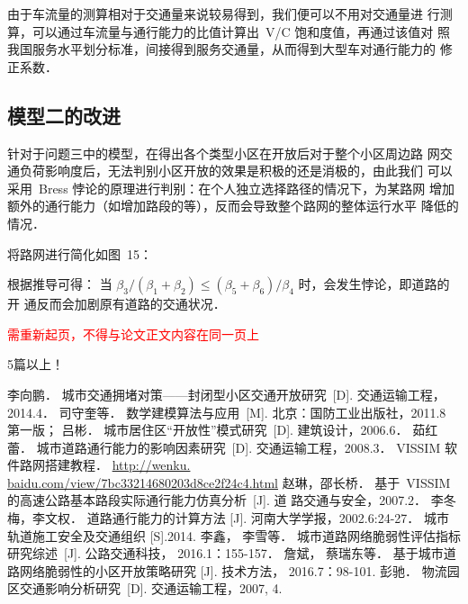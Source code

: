 \documentclass[12pt,a4paper]{nmmcm}
\begin{document}
由于车流量的测算相对于交通量来说较易得到，我们便可以不用对交通量进
行测算，可以通过车流量与通行能力的比值计算出~V/C 饱和度值，再通过该值对
照我国服务水平划分标准，间接得到服务交通量，从而得到大型车对通行能力的
修正系数．


\subsection{模型二的改进}

针对于问题三中的模型，在得出各个类型小区在开放后对于整个小区周边路
网交通负荷影响度后，无法判别小区开放的效果是积极的还是消极的，由此我们
可以采用~Bress 悖论的原理进行判别：在个人独立选择路径的情况下，为某路网
增加额外的通行能力（如增加路段的等），反而会导致整个路网的整体运行水平
降低的情况．

将路网进行简化如图~15：

根据推导可得： 当 $\beta_{3}/\left(\beta_{1}+\beta_{2}\right) \leq\left(\beta_{5}+\beta_{6}\right)/\beta_{4}$ 时，会发生悖论，即道路的开
通反而会加剧原有道路的交通状况．

\textcolor{red}{需重新起页，不得与论文正文内容在同一页上}

\begin{rmk}
5篇以上！
\end{rmk}

\newpage

\begin{thebibliography}{99}
 李向鹏． 城市交通拥堵对策——封闭型小区交通开放研究~[D]. 交通运输工程，
2014.4．
 司守奎等． 数学建模算法与应用~[M]. 北京：国防工业出版社，2011.8 第一版；
 吕彬． 城市居住区“开放性”模式研究~[D]. 建筑设计，2006.6．
 茹红蕾． 城市道路通行能力的影响因素研究~[D]. 交通运输工程，2008.3．
 VISSIM 软件路网搭建教程．
\url{http://wenku. baidu.com/view/7bc33214680203d8ce2f24c4.html}
 赵琳，邵长桥． 基于~VISSIM 的高速公路基本路段实际通行能力仿真分析~[J]. 道
路交通与安全，2007.2．
 李冬梅，李文权． 道路通行能力的计算方法 [J]. 河南大学学报，2002.6:24-27．
 城市轨道施工安全及交通组织 [S].2014.
 李鑫， 李雪等． 城市道路网络脆弱性评估指标研究综述~[J]. 公路交通科技，
2016.1：155-157．
 詹斌， 蔡瑞东等． 基于城市道路网络脆弱性的小区开放策略研究 [J]. 技术方法，
2016.7：98-101.
 彭驰． 物流园区交通影响分析研究~[D]. 交通运输工程，2007, 4.

\end{thebibliography}
\newpage
\end{document}
